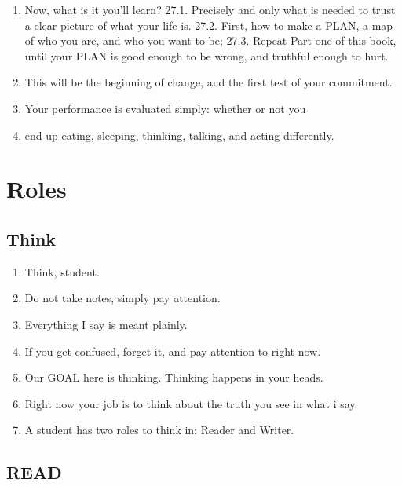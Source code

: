 \documentclass[
]{book}
\providecommand{\tightlist}{%
  \setlength{\itemsep}{0pt}\setlength{\parskip}{0pt}}
\begin{document}
\begin{enumerate}
\def\labelenumi{\arabic{enumi}.}
\setcounter{enumi}{26}
\tightlist
\item
  Now, what is it you'll learn?
  27.1. Precisely and only what is needed to trust a clear picture of what your life
  is.
  27.2. First, how to make a PLAN, a map of who you are, and who you want to be;
  27.3. Repeat Part one of this book, until your PLAN is good enough to be wrong,
  and truthful enough to hurt.
\item
  This will be the beginning of change, and the first test of your commitment.
\item
  Your performance is evaluated simply: whether or not you
\item
  end up eating, sleeping, thinking, talking, and acting differently.
\end{enumerate}

\hypertarget{roles}{%
\section{Roles}\label{roles}}

\hypertarget{think}{%
\subsection{Think}\label{think}}

\begin{enumerate}
\def\labelenumi{\arabic{enumi}.}
\setcounter{enumi}{30}
\tightlist
\item
  Think, student.
\item
  Do not take notes, simply pay attention.
\item
  Everything I say is meant plainly.
\item
  If you get confused, forget it, and pay attention to right now.
\item
  Our GOAL here is thinking. Thinking happens in your heads.
\item
  Right now your job is to think about the truth you see in what i say.
\item
  A student has two roles to think in: Reader and Writer.
\end{enumerate}

\hypertarget{read}{%
\subsection{READ}\label{read}}
\end{document}
